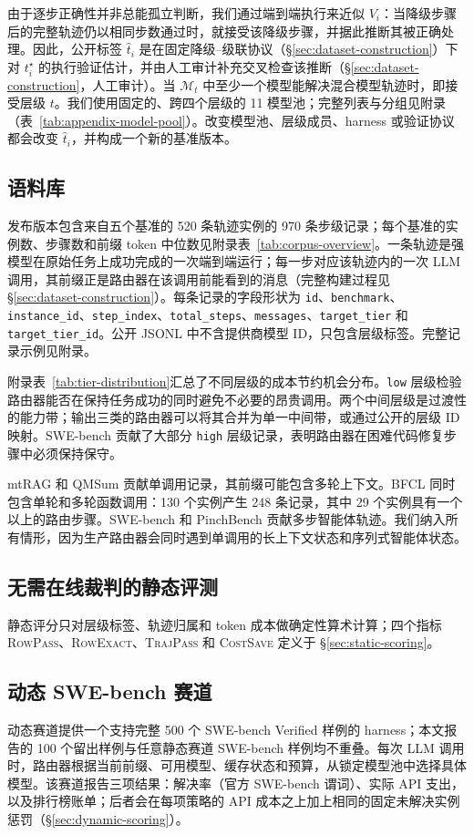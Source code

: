 由于逐步正确性并非总能孤立判断，我们通过端到端执行来近似 $V_i$：当降级步骤后的完整轨迹仍以相同步数通过时，就接受该降级步骤，并据此推断其被正确处理。因此，公开标签 $\hat{t}_i$ 是在固定降级--级联协议（\S\ref{sec:dataset-construction}）下对 $t_i^\star$ 的执行验证估计，并由人工审计补充交叉检查该推断（\S\ref{sec:dataset-construction}，人工审计）。当 $\mathcal M_t$ 中至少一个模型能解决混合模型轨迹时，即接受层级 $t$。我们使用固定的、跨四个层级的 11 模型池；完整列表与分组见附录（表~\ref{tab:appendix-model-pool}）。改变模型池、层级成员、harness 或验证协议都会改变 $\hat{t}_i$，并构成一个新的基准版本。

\subsection{语料库}

发布版本包含来自五个基准的 520 条轨迹实例的 970 条步级记录；每个基准的实例数、步骤数和前缀 token 中位数见附录表~\ref{tab:corpus-overview}。一条轨迹是强模型在原始任务上成功完成的一次端到端运行；每一步对应该轨迹内的一次 LLM 调用，其前缀正是路由器在该调用前能看到的消息（完整构建过程见 \S\ref{sec:dataset-construction}）。每条记录的字段形状为 \texttt{id}、\texttt{benchmark}、\texttt{instance\_id}、\texttt{step\_index}、\texttt{total\_steps}、\texttt{messages}、\texttt{target\_tier} 和 \texttt{target\_tier\_id}。公开 JSONL 中不含提供商模型 ID，只包含层级标签。完整记录示例见附录。

附录表~\ref{tab:tier-distribution}汇总了不同层级的成本节约机会分布。\texttt{low} 层级检验路由器能否在保持任务成功的同时避免不必要的昂贵调用。两个中间层级是过渡性的能力带；输出三类的路由器可以将其合并为单一中间带，或通过公开的层级 ID 映射。SWE-bench 贡献了大部分 \texttt{high} 层级记录，表明路由器在困难代码修复步骤中必须保持保守。

mtRAG 和 QMSum 贡献单调用记录，其前缀可能包含多轮上下文。BFCL 同时包含单轮和多轮函数调用：130 个实例产生 248 条记录，其中 29 个实例具有一个以上的路由步骤。SWE-bench 和 PinchBench 贡献多步智能体轨迹。我们纳入所有情形，因为生产路由器会同时遇到单调用的长上下文状态和序列式智能体状态。

\subsection{无需在线裁判的静态评测}

静态评分只对层级标签、轨迹归属和 token 成本做确定性算术计算；四个指标 \textsc{RowPass}、\textsc{RowExact}、\textsc{TrajPass} 和 \textsc{CostSave} 定义于 \S\ref{sec:static-scoring}。

\subsection{动态 SWE-bench 赛道}

动态赛道提供一个支持完整 500 个 SWE-bench Verified 样例的 harness；本文报告的 100 个留出样例与任意静态赛道 SWE-bench 样例均不重叠。每次 LLM 调用时，路由器根据当前前缀、可用模型、缓存状态和预算，从锁定模型池中选择具体模型。该赛道报告三项结果：解决率（官方 SWE-bench 谓词）、实际 API 支出，以及排行榜账单；后者会在每项策略的 API 成本之上加上相同的固定未解决实例惩罚（\S\ref{sec:dynamic-scoring}）。
